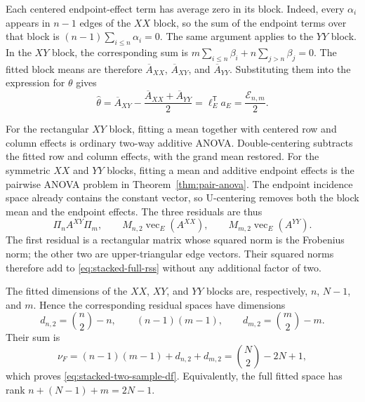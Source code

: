 \documentclass[11pt]{article}
\theoremstyle{plain}
\theoremstyle{definition}
\theoremstyle{remark}
\begin{document}
Each centered endpoint-effect term has average zero in its block.  Indeed,
every $\alpha_i$ appears in $n-1$ edges of the $XX$ block, so the sum of the
endpoint terms over that block is
$(n-1)\sum_{i\le n}\alpha_i=0$.  The same argument applies to the $YY$ block.
In the $XY$ block, the corresponding sum is
$m\sum_{i\le n}\beta_i+n\sum_{j>n}\beta_j=0$.
The fitted block means are therefore
$\overline A_{XX}$, $\overline A_{XY}$, and $\overline A_{YY}$.  Substituting
them into the expression for $\theta$ gives
\[
 \widehat\theta
 =\overline A_{XY}
  -\frac{\overline A_{XX}+\overline A_{YY}}2
 =\ell_E^\mathsf Ta_E
 =\frac{\mathcal E_{n,m}}2.
\]

For the rectangular $XY$ block, fitting a mean together with centered row
and column effects is ordinary two-way additive ANOVA.  Double-centering
subtracts the fitted row and column effects, with the grand mean restored.
For the symmetric $XX$ and $YY$ blocks, fitting a mean and additive endpoint
effects is the pairwise ANOVA problem in Theorem~\ref{thm:pair-anova}.  The
endpoint incidence space already contains the constant vector, so
U-centering removes both the block mean and the endpoint effects.  The three
residuals are thus
\[
 \Pi_nA^{XY}\Pi_m,
 \qquad
 M_{n,2}\operatorname{vec}_E(A^{XX}),
 \qquad
 M_{m,2}\operatorname{vec}_E(A^{YY}).
\]
The first residual is a rectangular matrix whose squared norm is the
Frobenius norm; the other two are upper-triangular edge vectors.  Their
squared norms therefore add to \eqref{eq:stacked-full-rss} without any
additional factor of two.

The fitted dimensions of the $XX$, $XY$, and $YY$ blocks are, respectively,
$n$, $N-1$, and $m$.  Hence the corresponding residual spaces have
dimensions
\[
 d_{n,2}=\binom n2-n,
 \qquad
 (n-1)(m-1),
 \qquad
 d_{m,2}=\binom m2-m.
\]
Their sum is
\[
 \nu_F=(n-1)(m-1)+d_{n,2}+d_{m,2}
 =\binom N2-2N+1,
\]
which proves \eqref{eq:stacked-two-sample-df}.  Equivalently, the full fitted
space has rank $n+(N-1)+m=2N-1$.
\end{document}
